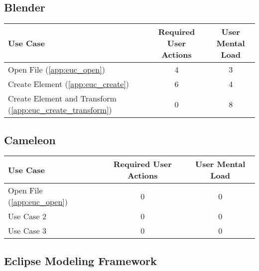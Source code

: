 \subsection*{Blender}




\begin{tabularx}{\textwidth}{Xcc}
\textbf{Use Case} & \textbf{Required User Actions} & \textbf{User Mental Load}\\
\hline
Open File (\ref{app:euc_open})        & 4 & 3 \\
Create Element (\ref{app:euc_create}) & 6 & 4 \\
Create Element and Transform (\ref{app:euc_create_transform}) & {\color{red}0} & 8
\end{tabularx}

\subsection*{Cameleon}

\begin{tabularx}{\textwidth}{Xcc}
\textbf{Use Case} & \textbf{Required User Actions} & \textbf{User Mental Load}\\
\hline
Open File (\ref{app:euc_open}) & {\color{red}0} & {\color{red}0} \\
Use Case 2                     & {\color{red}0} & {\color{red}0} \\
Use Case 3                     & {\color{red}0} & {\color{red}0}
\end{tabularx}

\subsection*{Eclipse Modeling Framework}


